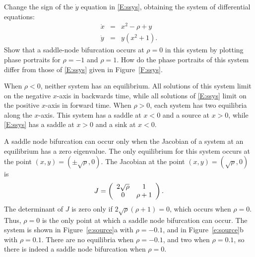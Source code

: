 \documentclass{ximera}
\begin{document}
\begin{computerExercise} \label{e:source}
Change the sign of the $\dot{y}$ equation in \eqref{E:ssys}, obtaining the 
system of differential equations:  
\[
\begin{array}{rcl}
\dot{x} & = & x^2 - \rho + y \\
\dot{y} & = & y(x^2+1).  \end{array}
\]
Show that a saddle-node bifurcation occurs at $\rho=0$ in this system by 
plotting phase portraits for $\rho=-1$ and $\rho=1$.  How do the 
phase portraits of this system differ from those of \eqref{E:ssys} 
given in Figure~\ref{F:ssys}.

\begin{solution}

\ans When $\rho < 0$, neither system has an equilibrium.  All solutions of
this system limit on the negative $x$-axis in backwards time, while all
solutions of \eqref{E:ssys} limit on the positive $x$-axis in forward time.
When $\rho > 0$, each system has two equilibria along the $x$-axis.  This
system has a saddle at $x < 0$ and a source at $x > 0$, while \eqref{E:ssys}
has a saddle at $x > 0$ and a sink at $x < 0$.

\soln
A saddle node bifurcation can occur only when the Jacobian of a system
at an equilibrium has a zero eigenvalue.  The only equilibrium for this
system occurs at the point $(x,y) = (\pm\sqrt{\rho},0)$.  The Jacobian
at the point $(x,y) = (\sqrt{\rho},0)$ is
\[
J = \left(\begin{array}{cc} 2\sqrt{\rho} & 1\\ 0 &\rho + 1\end{array}\right).
\]
The determinant of $J$ is zero only if $2\sqrt{\rho}(\rho + 1) = 0$, which
occurs when $\rho = 0$.  Thus, $\rho = 0$ is the only point at which a
saddle node bifurcation can occur.  The system is shown in
Figure~\ref{e:source}a with $\rho = -0.1$, and in Figure~\ref{e:source}b
with $\rho = 0.1$.  There are no equilibria when $\rho = -0.1$, and two
when $\rho = 0.1$, so there is indeed a saddle node bifurcation when
$\rho = 0$.


\end{solution}
\end{computerExercise}
\end{document}
